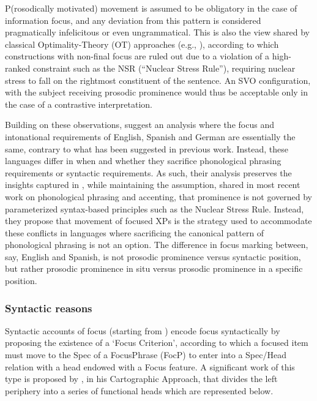 P(rosodically motivated) movement is assumed to be obligatory in the case of information focus, and any deviation from this pattern is considered pragmatically infelicitous or even ungrammatical. This is also the view shared by classical Optimality-Theory (OT) approaches (e.g.,  \cite{costa2001postverbal, gutierrez2013structural, samek2001crosslinguistic}), according to which constructions with non-final focus are ruled out due to a violation of a high-ranked constraint such as the NSR (“Nuclear Stress Rule”), requiring nuclear stress to fall on the rightmost constituent of the sentence. An SVO configuration, with the subject receiving prosodic prominence would thus be acceptable only in the case of a contrastive interpretation.

Building on these observations, \textcite{buring2001focus} suggest an analysis where the focus and intonational requirements of English, Spanish and German are essentially the same, contrary to what has been suggested in previous work.  Instead, these languages differ in when and whether they sacrifice phonological phrasing requirements or syntactic requirements.  As such, their analysis preserves the insights captured in \textcite{zubizarreta1998prosody}, while maintaining the assumption, shared in most recent work on phonological phrasing and accenting, that prominence is not governed by parameterized syntax-based principles such as the Nuclear Stress Rule. Instead, they propose that movement of focused XPs is the strategy used to accommodate these conflicts in languages where sacrificing the canonical pattern of phonological phrasing is not an option. The difference in focus marking between, say, English and Spanish, is not prosodic prominence versus syntactic position, but rather prosodic prominence in situ versus prosodic prominence in a specific position.

\subsubsection{Syntactic reasons}

Syntactic accounts of focus (starting from \cite{brody1990some}) encode focus  syntactically  by  proposing  the  existence  of  a  ‘Focus  Criterion’, according to which a focused item must move to the Spec of a FocusPhrase (FocP) to enter into a Spec/Head relation with a head endowed with a Focus feature. A significant work of this type is proposed by \textcite{rizzi1997fine}, in his Cartographic Approach, that divides the left periphery into a series of functional heads which are represented below.

